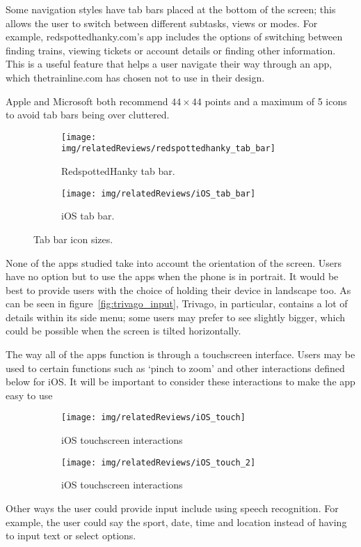 Some navigation styles have tab bars placed at the bottom of the screen; this
allows the user to switch between different subtasks, views or modes. For
example, redspottedhanky.com's app includes the options of switching between
finding trains, viewing tickets or account details or finding other
information. This is a useful feature that helps a user navigate their way
through an app, which thetrainline.com has chosen not to use in their design.

Apple and Microsoft both recommend $44\times44$ points and a maximum of 5 icons
to avoid tab bars being over cluttered.
\begin{figure}[htbp]
	\centering
	\begin{subfigure}[b]{0.35\textwidth}
		\texttt{[image: img/relatedReviews/redspottedhanky\_tab\_bar]}
		\caption{RedspottedHanky tab bar. }\label{fig:redspottedhanky_tab_bar}
	\end{subfigure}%
	\qquad
	\begin{subfigure}[b]{0.4\textwidth}
		\texttt{[image: img/relatedReviews/iOS\_tab\_bar]}
		\caption{iOS tab bar.}\label{fig:iOS_tab_bar}
	\end{subfigure}
	\caption{Tab bar icon sizes.}
\end{figure}

None of the apps studied take into account the orientation of the screen. Users
have no option but to use the apps when the phone is in portrait. It would be
best to provide users with the choice of holding their device in landscape too.
As can be seen in figure~\ref{fig:trivago_input}, Trivago, in particular,
contains a lot of details within its side menu; some users may prefer to see
slightly bigger, which could be possible when the screen is tilted
horizontally.

The way all of the apps function is through a touchscreen interface. Users may
be used to certain functions such as `pinch to zoom' and other interactions
defined below for iOS\@. It will be important to consider these interactions to
make the app easy to use
\begin{figure}[htbp]
	\centering
	\begin{subfigure}[b]{0.7\textwidth}
		\texttt{[image: img/relatedReviews/iOS\_touch]}
		\caption{iOS touchscreen interactions}\label{fig:iOS_touch}
	\end{subfigure}%
	\qquad
	\begin{subfigure}[b]{0.7\textwidth}
		\texttt{[image: img/relatedReviews/iOS\_touch\_2]}
		\caption{iOS touchscreen interactions}
	\end{subfigure}
	\caption{}\label{fig:iOS_touch2}
\end{figure}

Other ways the user could provide input include using speech recognition. For
example, the user could say the sport, date, time and location instead of
having to input text or select options.

